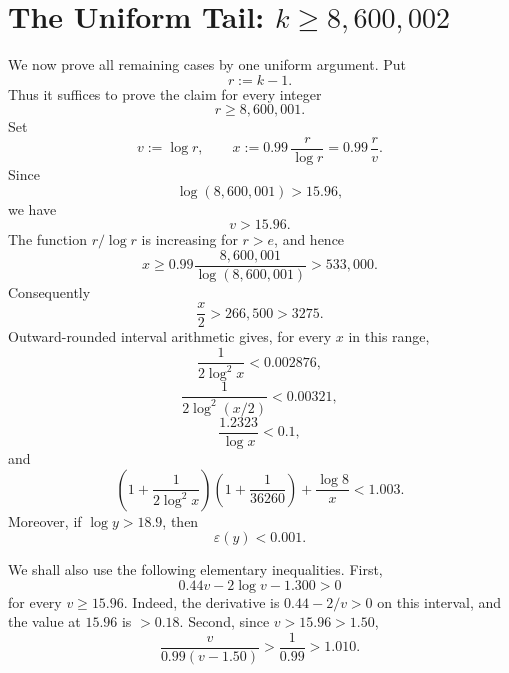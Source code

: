 \documentclass[11pt]{article}
\numberwithin{equation}{section}
\theoremstyle{plain}
\theoremstyle{definition}
\theoremstyle{remark}
\newcommand{\eps}{\varepsilon}
\begin{document}
\section{The Uniform Tail: \texorpdfstring{\(k\ge8{,}600{,}002\)}{k >= 8,600,002}}
\label{sec:tail}

We now prove all remaining cases by one uniform argument.  Put
\[
        r:=k-1.
\]
Thus it suffices to prove the claim for every integer
\[
        r\ge8{,}600{,}001.
\]
Set
\[
        v:=\log r,
        \qquad
        x:=0.99\,\frac r{\log r}=0.99\,\frac r v.
\]
Since
\[
        \log(8{,}600{,}001)>15.96,
\]
we have
\begin{equation}\label{eq:v-lower}
v>15.96.
\end{equation}
The function \(r/\log r\) is increasing for \(r>e\), and hence
\begin{equation}\label{eq:x-lower}
x\ge 0.99\frac{8{,}600{,}001}{\log(8{,}600{,}001)}
        >533{,}000.
\end{equation}
Consequently
\begin{equation}\label{eq:x-half-lower}
\frac x2>266{,}500>3275.
\end{equation}
Outward-rounded interval arithmetic gives, for every \(x\) in this range,
\begin{equation}\label{eq:logx-error}
\frac1{2\log^2 x}<0.002876,
\end{equation}
\begin{equation}\label{eq:logxhalf-error}
\frac1{2\log^2(x/2)}<0.00321,
\end{equation}
\begin{equation}\label{eq:theta-error-small}
\frac{1.2323}{\log x}<0.1,
\end{equation}
and
\begin{equation}\label{eq:M-factor-bound}
\left(1+\frac1{2\log^2x}\right)
        \left(1+\frac1{36260}\right)
        +\frac{\log 8}{x}
        <1.003.
\end{equation}
Moreover, if \(\log y>18.9\), then
\begin{equation}\label{eq:eps-small}
\eps(y)<0.001.
\end{equation}

We shall also use the following elementary inequalities.  First,
\begin{equation}\label{eq:tail-elementary-one}
0.44v-2\log v-1.300>0
\end{equation}
for every \(v\ge15.96\).  Indeed, the derivative is \(0.44-2/v>0\) on this interval, and the value at \(15.96\) is \(>0.18\).  Second, since \(v>15.96>1.50\),
\begin{equation}\label{eq:tail-elementary-two}
\frac{v}{0.99(v-1.50)}>\frac1{0.99}>1.010.
\end{equation}
\end{document}
